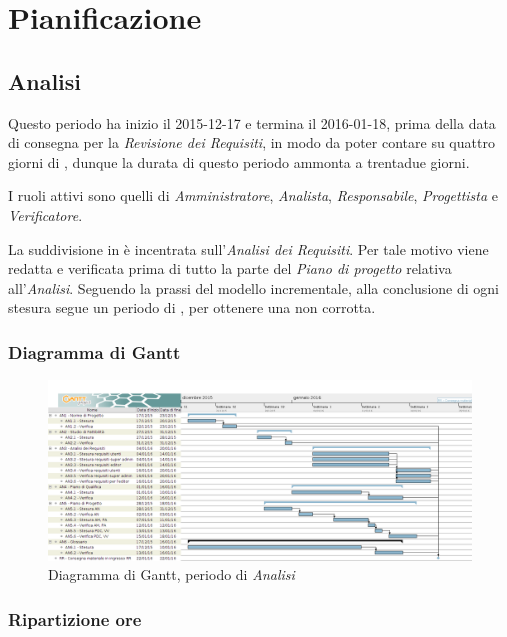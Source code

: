 \section{Pianificazione}
\subsection{Analisi}
Questo periodo ha inizio il 2015-12-17 e termina il 2016-01-18, prima della data di consegna per la \textit{Revisione dei Requisiti}, in modo da poter contare su quattro giorni di , dunque la durata di questo periodo ammonta a trentadue giorni.

I ruoli attivi sono quelli di \textit{Amministratore}, \textit{Analista}, \textit{Responsabile}, \textit{Progettista} e \textit{Verificatore}.

La suddivisione in  \`e incentrata sull'\textit{Analisi dei Requisiti}. Per tale motivo viene redatta e verificata prima di tutto la parte del \textit{Piano di progetto} relativa all'\textit{Analisi}. Seguendo la prassi del modello incrementale, alla conclusione di ogni stesura segue un periodo di , per ottenere una  non corrotta.
\subsubsection{Diagramma di Gantt}
\begin{figure}[ht!]
\includegraphics[width=1\textwidth]{res/img/pianificazione/Analisi.png}
\caption{Diagramma di Gantt, periodo di \textit{Analisi}}
\end{figure}

\subsubsection{Ripartizione ore}

